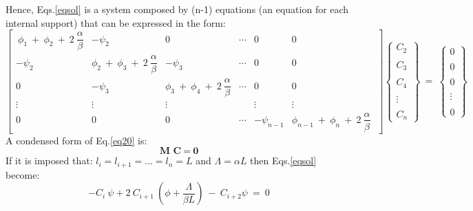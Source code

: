 \documentclass{article}
\begin{document}
{\noindent Hence, Eqs.\ref{eqsol} is a system composed by (n-1) equations (an equation for each internal support) that can be expressed in the form:
\begin{equation}
    \begin{bmatrix}
     \  \phi_1\  + \ \phi_2 \ + \ 2 \ \dfrac{\alpha}{\beta} & -\psi_2 &  0  & \cdots &  0  & 0 \\
       -\psi_2  &   \phi_2\  + \ \phi_3 \ + \ 2 \ \dfrac{\alpha}{\beta}  &  -\psi_3    &  \cdots  & 0  & 0\\
        0   &   -\psi_3  &   \phi_3\  + \ \phi_4 \ + \ 2 \ \dfrac{\alpha}{\beta}   & \cdots &  0 &  0\\
        \vdots  & \vdots   & \vdots  &  & \vdots & \vdots \\
        0  & 0  & 0   & \cdots &  -\psi_{n-1}  &   \phi_{n-1}\  + \ \phi_n \ + \ 2 \ \dfrac{\alpha}{\beta} \; 
    \end{bmatrix}
    \begin{Bmatrix}
      C_2 \\
      \\
      C_3 \\
      \\
      C_4 \\
      \\
      \vdots \\
      \\
      C_{n}
    \end{Bmatrix}
    \ = \ 
    \begin{Bmatrix}
    0 \\
      \\
      0 \\
      \\
      0 \\
      \\
      \vdots \\
      \\
      0
    \end{Bmatrix}
    \label{eq20}
\end{equation}
\noindent A condensed form of Eq.\ref{eq20} is:
\begin{equation}
    \textbf{M C} \ = \ \textbf{0}
    \label{eq:linsys}
\end{equation}
\noindent If it is imposed that: $l_i = l_{i+1} = ... = l_n =  L$ and $\Lambda =\alpha L$ then Eqs.\ref{eqsol} become:
\begin{equation}
    -C_i\  \psi + 2 \ C_{i+1} \ ( \phi +\dfrac{\Lambda}{\beta L}) \ - \ C_{i+2} \psi \ = \ 0

\end{equation}}
\end{document}
